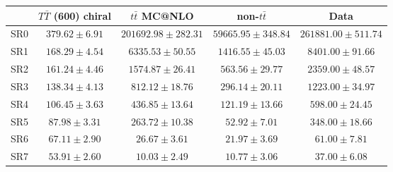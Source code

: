 \begin{tabular}{l c c c c } \toprule
 & $T\bar{T}$ (600) chiral 		 & $t\bar{t}$ MC@NLO 		 & non-$t\bar{t}$ 		 & Data 		 \\ \midrule 
SR0  & $379.62 \pm 6.91$  & $201692.98 \pm 282.31$  & $59665.95 \pm 348.84$  & $261881.00 \pm 511.74$ \\ 
SR1  & $168.29 \pm 4.54$  & $6335.53 \pm 50.55$  & $1416.55 \pm 45.03$  & $8401.00 \pm 91.66$ \\ 
SR2  & $161.24 \pm 4.46$  & $1574.87 \pm 26.41$  & $563.56 \pm 29.77$  & $2359.00 \pm 48.57$ \\ 
SR3  & $138.34 \pm 4.13$  & $812.12 \pm 18.76$  & $296.14 \pm 20.11$  & $1223.00 \pm 34.97$ \\ 
SR4  & $106.45 \pm 3.63$  & $436.85 \pm 13.64$  & $121.19 \pm 13.66$  & $598.00 \pm 24.45$ \\ 
SR5  & $87.98 \pm 3.31$  & $263.72 \pm 10.38$  & $52.92 \pm 7.01$  & $348.00 \pm 18.66$ \\ 
SR6  & $67.11 \pm 2.90$  & $26.67 \pm 3.61$  & $21.97 \pm 3.69$  & $61.00 \pm 7.81$ \\ 
SR7  & $53.91 \pm 2.60$  & $10.03 \pm 2.49$  & $10.77 \pm 3.06$  & $37.00 \pm 6.08$ \\ 
\bottomrule\end{tabular}
